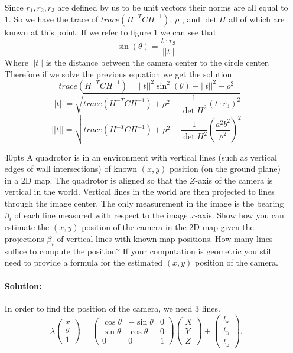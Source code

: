 \documentclass[11pt,english]{article}
\begin{document}
\begin{enumerate}
Since $r_1 , r_2 , r_3 $ are defined by us to be unit vectors their norms are all equal to 1. 
So we have the trace of $trace(H^{-T} C H^{-1})$, $\rho $ , and $\det H$ all of which are known at this point.  If we refer to figure 1 we can see that 
$$ 
\sin(\theta) =\frac{ t \cdot r_3}{|| t ||}  
$$ 
Where $|| t ||$ is the distance between the camera center to the circle center.  
Therefore if we solve the previous equation we get the solution  
$$
 trace(H^{-T} C H^{-1} )  = ||t||^2 \sin^2 (\theta) + ||t||^2 - \rho^2 
$$
$$
||t|| = \sqrt{ trace(H^{-T} C H^{-1} ) + \rho^2 - \frac{1}{\det H^2} (t \cdot r_3)^2 }
$$
\begin{equation}
 ||t || =  \sqrt{ trace( H^{-T} C H^{-1}) + \rho^2 - \frac{1}{\det H^2} (\frac{a^2b^2}{\rho^2})^2 }
\end{equation}

\item[40pts]
A quadrotor is in an environment with vertical lines (such as vertical edges of wall intersections) of known $(x,y)$ position (on the ground plane) in a 2D map.  The quadrotor is aligned so that the $Z$-axis of the camera is vertical in the world. Vertical lines in the world are then projected to lines through the image center. The only measurement in the image is the bearing $\beta_i$ of each line measured with respect to the image $x$-axis. Show how you can estimate the $(x,y)$ position of the camera in the 2D map given the projections $\beta_i$ of vertical lines with known map positions. How many lines suffice to compute the position? If your computation is geometric you still need to provide a formula for the estimated $(x,y)$ position of the camera. 

\paragraph{Solution:}
In order to find the position of the camera, we need 3 lines. 
\[
\lambda \begin{pmatrix} x \\ y \\ 1 \end{pmatrix}  = \begin{pmatrix} \cos\theta &  -\sin\theta & 0
\\ \sin\theta & \cos\theta & 0 
\\ 0& 0 & 1
\end{pmatrix}
 \begin{pmatrix} X \\ Y \\ Z \end{pmatrix} + \begin{pmatrix} t_x \\ t_y \\ t_z \end{pmatrix}.
 \]


\end{enumerate}
\end{document}
